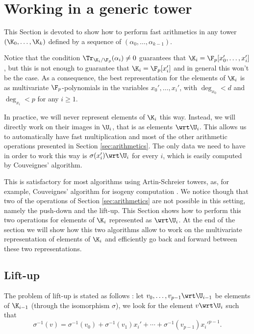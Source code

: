 \section{Working in a generic tower}
\label{sec:isomorphism}

This Section is devoted to show how to perform fast arithmetics in any
tower $(\K_0,\ldots,\K_k)$ defined by a sequence of
$(\alpha_0,\ldots,\alpha_{k-1})$.

Notice that the condition $\Tr_{\K_i/\F_p}(\alpha_i)\ne0$ guarantees
that $\K_i = \F_p[x_0',\ldots,x_i']$, but this is not enough to
guarantee that $\K_i = \F_p[x_i']$ and in general this won't be the
case. As a consequence, the best representation for the elements of
$\K_i$ is as multivariate $\F_p$-polynomials in the variables
$x_0',\ldots,x_i'$, with $\deg_{x_0}<d$ and $\deg_{x_i}<p$ for any
$i\ge1$.

In practice, we will never represent elements of $\K_i$ this
way. Instead, we will directly work on their images in $\U_i$, that is
as elements $\wrt\U_i$. This allows us to automatically have fast
multiplication and most of the other arithmetic operations presented
in Section \ref{sec:arithmetics}. The only data we need to have in
order to work this way is $\sigma(x_i')\wrt\U_i$ for every $i$, which
is easily computed by Couveignes' algorithm.

This is satisfactory for most algorithms using Artin-Schreier
towers, as, for example, Couveignes' algorithm for isogeny computation
\cite{Cou96}. We notice though that two of the operations of Section
\ref{sec:arithmetics} are not possible in this setting, namely the
push-down and the lift-up. This Section shows how to perform this two
operations for elements of $\K_i$ represented as $\wrt\U_i$. At the
end of the section we will show how this two algorithms allow to work
on the multivariate representation of elements of $\K_i$ and
efficiently go back and forward between these two representations.

\subsection{Lift-up}
\label{sec:isomorphism:lift-up}
The problem of lift-up is stated as follows : let
$v_0,\ldots,v_{p-1}\wrt\U_{i-1}$ be elements of $\K_{i-1}$ (through
the isomorphism $\sigma$), we look for the element $v\wrt\U_i$ such
that
\begin{equation*}
  \sigma^{-1}(v) =
  \sigma^{-1}(v_0) + \sigma^{-1}(v_1)x_i' +
  \cdots + \sigma^{-1}(v_{p-1})x_i'^{p-1}
  \text{.}
\end{equation*}


